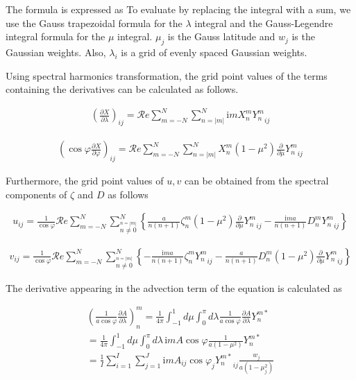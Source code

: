 The formula is expressed as To evaluate by replacing the integral with a
sum, we use the Gauss trapezoidal formula for the \(\lambda\) integral
and the Gauss-Legendre integral formula for the \(\mu\) integral.
\(\mu_j\) is the Gauss latitude and \(w_j\) is the Gaussian weights.
Also, \(\lambda_i\) is a grid of evenly spaced Gaussian weights.

Using spectral harmonics transformation, the grid point values of the
terms containing the derivatives can be calculated as follows.

\begin{eqnarray}
        \left(  \frac{\partial X}{\partial \lambda} \right)_{ij}
     =  
        {\mathcal Re} \sum_{m=-N}^{N} \sum_{n=|m|}^{N}
       \mathrm{i}m X_n^m {Y_n^m}_{ij}
\end{eqnarray}

\begin{eqnarray}
   \left( \cos\varphi \frac{\partial X}{\partial \varphi} \right)_{ij}
     =  {\mathcal Re} \sum_{m=-N}^{N} \sum_{n=|m|}^{N}
       X_n^m
       ( 1-\mu^{2} ) \frac{\partial }{\partial \mu} {Y_n^m}_{ij}
\end{eqnarray}

Furthermore, the grid point values of \(u,v\) can be obtained from the
spectral components of \(\zeta\) and \(D\) as follows

\begin{eqnarray}
  u_{ij}
  = \frac{1}{\cos\varphi}
     {\mathcal Re} \sum_{m=-N}^{N}
                       \sum_{\stackrel{n=|m|}{n \neq 0}}^{N}
    \left\{
             \frac{a}{n(n+1)} \zeta_n^m
            (1-\mu^{2}) \frac{\partial{}}{\partial {\mu}} {Y_n^m}_{ij}
          -  \frac{\mathrm{i}m a}{n(n+1)} D_n^m {Y_n^m}_{ij}
    \right\}
\end{eqnarray}

\begin{eqnarray}
  v_{ij}
  = \frac{1}{\cos\varphi}
   {\mathcal Re} \sum_{m=-N}^{N}
                     \sum_{\stackrel{n=|m|}{n \neq 0}}^{N}
    \left\{
          -  \frac{\mathrm{i}m a}{n(n+1)} \zeta_n^m {Y_n^m}_{ij}
          -  \frac{a}{n(n+1)} D_n^m
            (1-\mu^{2}) \frac{\partial{}}{\partial {\mu}} {Y_n^m}_{ij}
    \right\}
\end{eqnarray}

The derivative appearing in the advection term of the equation is
calculated as

\begin{eqnarray}
  \left( \frac{1}{a\cos\varphi} \frac{\partial{A}}{\partial {\lambda}} \right)_n^m
   =  \frac{1}{4 \pi}
        \int_{-1}^{1} d \mu \int_{0}^{\pi} d \lambda
          \frac{1}{a\cos\varphi} \frac{\partial{A}}{\partial {\lambda}} Y_n^{m *} \\
   =  \frac{1}{4 \pi}
        \int_{-1}^{1} d \mu \int_{0}^{\pi} d \lambda \,
          \mathrm{i}m A \cos\varphi \frac{1}{a(1-\mu^{2})} Y_n^{m *} \\
   =  \frac{1}{I} \sum_{i=1}^{I} \sum_{j=1}^{J}  
          \mathrm{i}m A_{ij} \cos\varphi_j
          {Y_n^{m *}}_{ij} \frac{w_j}{a(1-\mu_j^{2})}
\end{eqnarray}


